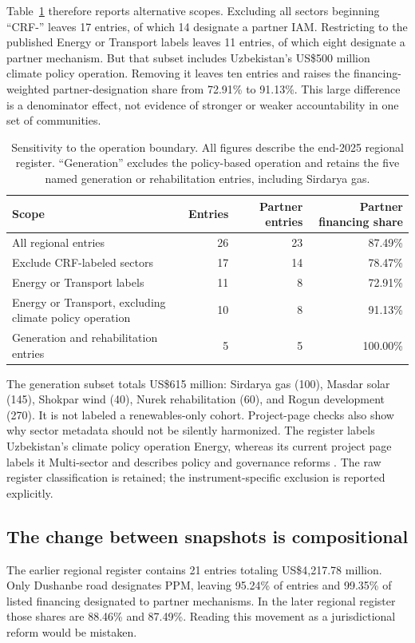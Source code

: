 \documentclass[11pt,a4paper]{article}
\newcommand{\USD}{US\$}
\begin{document}
Table~\ref{tab:scopes} therefore reports alternative scopes. Excluding all sectors beginning ``CRF-'' leaves 17 entries, of which 14 designate a partner IAM. Restricting to the published Energy or Transport labels leaves 11 entries, of which eight designate a partner mechanism. But that subset includes Uzbekistan's \USD500 million climate policy operation. Removing it leaves ten entries and raises the financing-weighted partner-designation share from 72.91\% to 91.13\%. This large difference is a denominator effect, not evidence of stronger or weaker accountability in one set of communities.

\begin{table}[htbp]\centering\small
\caption{Sensitivity to the operation boundary. All figures describe the end-2025 regional register. ``Generation'' excludes the policy-based operation and retains the five named generation or rehabilitation entries, including Sirdarya gas.}\label{tab:scopes}
\begin{tabular}{p{6.6cm}rrr}\toprule
Scope & Entries & Partner entries & Partner financing share\\\midrule
All regional entries &26&23&87.49\%\\
Exclude CRF-labeled sectors &17&14&78.47\%\\
Energy or Transport labels &11&8&72.91\%\\
Energy or Transport, excluding climate policy operation &10&8&91.13\%\\
Generation and rehabilitation entries &5&5&100.00\%\\\bottomrule
\end{tabular}
\end{table}

The generation subset totals \USD615 million: Sirdarya gas (100), Masdar solar (145), Shokpar wind (40), Nurek rehabilitation (60), and Rogun development (270). It is not labeled a renewables-only cohort. Project-page checks also show why sector metadata should not be silently harmonized. The register labels Uzbekistan's climate policy operation Energy, whereas its current project page labels it Multi-sector and describes policy and governance reforms \citep{uzbekcpbf}. The raw register classification is retained; the instrument-specific exclusion is reported explicitly.

\subsection{The change between snapshots is compositional}
The earlier regional register contains 21 entries totaling \USD4,217.78 million. Only Dushanbe road designates PPM, leaving 95.24\% of entries and 99.35\% of listed financing designated to partner mechanisms. In the later regional register those shares are 88.46\% and 87.49\%. Reading this movement as a jurisdictional reform would be mistaken.
\end{document}
